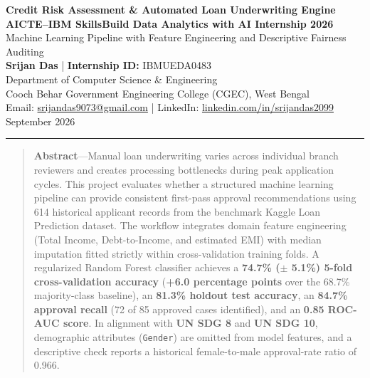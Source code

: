 \documentclass[11pt,a4paper]{article}
\begin{document}

\begin{center}
    {\fontsize{18pt}{22pt}\selectfont \textbf{Credit Risk Assessment \& Automated Loan Underwriting Engine}}\\[0.20cm]
    {\fontsize{11pt}{13.5pt}\selectfont \textbf{AICTE--IBM SkillsBuild Data Analytics with AI Internship 2026}}\\[0.10cm]
    {\fontsize{10pt}{12pt}\selectfont Machine Learning Pipeline with Feature Engineering and Descriptive Fairness Auditing}\\[0.28cm]
    
    {\fontsize{10pt}{12pt}\selectfont \textbf{Srijan Das} \quad | \quad \textbf{Internship ID:} IBMUEDA0483} \\
    {\fontsize{9.5pt}{11.5pt}\selectfont Department of Computer Science \& Engineering} \\
    {\fontsize{9.5pt}{11.5pt}\selectfont Cooch Behar Government Engineering College (CGEC), West Bengal} \\
    {\fontsize{9pt}{11pt}\selectfont Email: \href{mailto:srijandas9073@gmail.com}{srijandas9073@gmail.com} \quad | \quad LinkedIn: \href{https://www.linkedin.com/in/srijandas2099}{linkedin.com/in/srijandas2099}} \\[0.12cm]
    {\fontsize{9.5pt}{11.5pt}\selectfont September 2026}
\end{center}

\noindent\textcolor{rulecolor}{\rule{\textwidth}{0.6pt}}

\begin{quote}
\small \textbf{Abstract}---Manual loan underwriting varies across individual branch reviewers and creates processing bottlenecks during peak application cycles. This project evaluates whether a structured machine learning pipeline can provide consistent first-pass approval recommendations using 614 historical applicant records from the benchmark Kaggle Loan Prediction dataset. The workflow integrates domain feature engineering (Total Income, Debt-to-Income, and estimated EMI) with median imputation fitted strictly within cross-validation training folds. A regularized Random Forest classifier achieves a \textbf{74.7\% ($\pm$ 5.1\%) 5-fold cross-validation accuracy} (\textbf{+6.0 percentage points} over the 68.7\% majority-class baseline), an \textbf{81.3\% holdout test accuracy}, an \textbf{84.7\% approval recall} (72 of 85 approved cases identified), and an \textbf{0.85 ROC-AUC score}. In alignment with \textbf{UN SDG 8} and \textbf{UN SDG 10}, demographic attributes (\texttt{Gender}) are omitted from model features, and a descriptive check reports a historical female-to-male approval-rate ratio of 0.966.
\end{quote}
\end{document}
